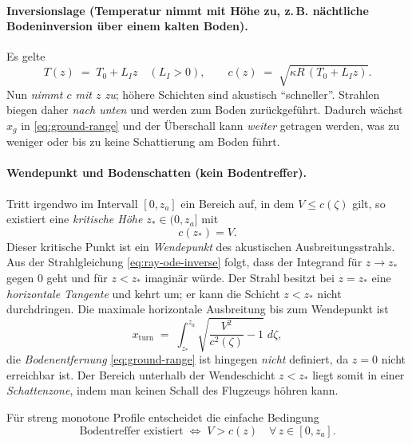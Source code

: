 \paragraph{Inversionslage (Temperatur nimmt mit Höhe zu, z.\,B.
nächtliche Bodeninversion über einem kalten Boden).}
Es gelte
\begin{equation}
    T(z) \;=\; T_0 + L_{I} z \quad (L_{I}>0),
    \qquad
    c(z) \;=\; \sqrt{\kappa R\,(T_0 + L_{I} z)} .
    \label{eq:inversion}
\end{equation}
Nun \emph{nimmt $c$ mit $z$ zu}; höhere Schichten sind akustisch ``schneller''.
Strahlen biegen daher \emph{nach unten} und werden zum Boden zurückgeführt.
Dadurch wächst $x_g$ in \eqref{eq:ground-range} und der Überschall
kann \emph{weiter} getragen werden, was zu weniger oder bis zu keine
Schattierung am Boden führt.

\paragraph{Wendepunkt und Bodenschatten (kein Bodentreffer).}
Tritt irgendwo im Intervall $[0,z_a]$ ein Bereich auf, in dem
$V\le c(\zeta)$ gilt, so existiert eine
\emph{kritische Höhe} $z_\ast\in(0,z_a]$ mit
\begin{equation}
    c(z_\ast)=V.
    \label{eq:turning-def}
\end{equation}
Dieser kritische Punkt ist ein \emph{Wendepunkt} des akustischen Ausbreitungsstrahls.
Aus der Strahlgleichung \eqref{eq:ray-ode-inverse} folgt, dass der
Integrand für $z\to z_\ast$ gegen $0$ geht und für $z<z_\ast$ imaginär würde.
Der Strahl besitzt bei $z=z_\ast$ eine \emph{horizontale Tangente} und kehrt um;
er kann die Schicht $z<z_\ast$ nicht durchdringen.
Die maximale horizontale Ausbreitung bis zum Wendepunkt ist
\begin{equation}
    x_{\mathrm{turn}}
    \;=\; \int_{z_\ast}^{z_a} \sqrt{\frac{V^2}{c^2(\zeta)}-1}\;d\zeta,
    \label{eq:x-turn}
\end{equation}
die \emph{Bodenentfernung} \eqref{eq:ground-range} ist hingegen \emph{nicht}
definiert, da $z=0$ nicht erreichbar ist.
Der Bereich unterhalb der Wendeschicht $z<z_\ast$ liegt somit in einer
\emph{Schattenzone}, indem man keinen Schall des Flugzeugs höhren kann.

Für streng monotone Profile entscheidet die einfache Bedingung
\begin{equation}
    \text{Bodentreffer existiert} \;\Leftrightarrow\; V>c(z)\quad\forall\,z\in[0,z_a].
    \label{eq:ground-hit-condition}
\end{equation}

